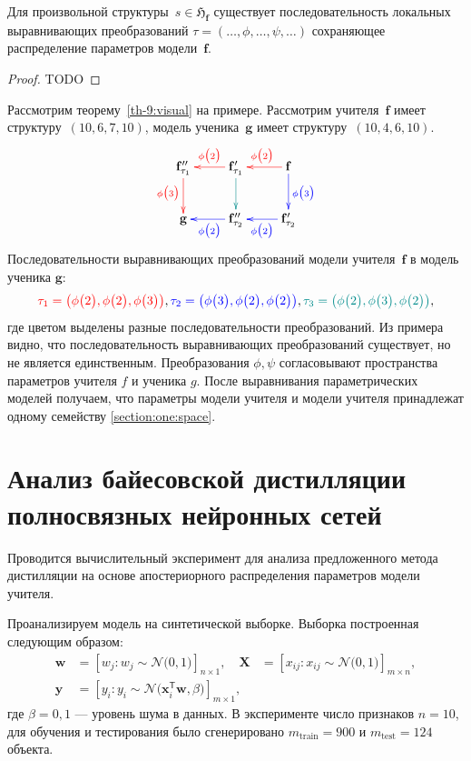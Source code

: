 \begin{theorem}
\label{th-9:visual}
Для произвольной структуры~$s \in \mathfrak{H}_{\mathbf{f}}$ существует последовательность локальных выравнивающих преобразований $\tau = (\ldots, \phi, \ldots, \psi, \ldots)$ сохраняющее распределение параметров модели~$\mathbf{f}$.
\end{theorem}
\begin{proof}
TODO
\end{proof}

Рассмотрим теорему~\ref{th-9:visual} на примере. Рассмотрим учителя~$\mathbf{f}$ имеет структуру~$(10, 6, 7, 10)$, модель ученика~$\mathbf{g}$ имеет структуру~$(10,4,6,10)$.
\[
\xymatrix{
\mathbf{f}_{\tau_1}''\ar@[red][d]_{\color{red}\phi\bigr(3\bigr)}
& 
\mathbf{f}_{\tau_1}'\ar@[red][l]_{\color{red}\phi\bigr(2\bigr)}\ar@[darkcyan][d]
&
\mathbf{f}\ar@[red][l]_{\color{red}\phi\bigr(2\bigr)}\ar@[blue][d]^{\color{blue}\phi\bigr(3\bigr)}
\\
\mathbf{g}
& 
\mathbf{f}_{\tau_2}''\ar@[blue][l]^{\color{blue}\phi\bigr(2\bigr)}
&
\mathbf{f}_{\tau_2}'\ar@[blue][l]^{\color{blue}\phi\bigr(2\bigr)}
}
\]
Последовательности выравнивающих преобразований модели учителя~$\mathbf{f}$ в модель ученика $\mathbf{g}$:
\[
{\color{red}\tau_1=\left(\phi\bigr(2\bigr), \phi\bigr(2\bigr), \phi\bigr(3\bigr)\right)}, {\color{blue}\tau_2=\left(\phi\bigr(3\bigr), \phi\bigr(2\bigr), \phi\bigr(2\bigr)\right)}, {\color{darkcyan}\tau_3=\left(\phi\bigr(2\bigr), \phi\bigr(3\bigr), \phi\bigr(2\bigr)\right)},
\]
где цветом выделены разные последовательности преобразований.
Из примера видно, что последовательность выравнивающих преобразований существует, но не является единственным. Преобразования $\phi, \psi$ согласовывают пространства параметров учителя $f$ и ученика $g$. После выравнивания параметрических моделей получаем, что параметры модели учителя и модели учителя принадлежат одному семейству \ref{section:one:space}.

\section{Анализ байесовской дистилляции полносвязных нейронных сетей}
Проводится вычислительный эксперимент для анализа предложенного метода дистилляции на основе апостериорного распределения параметров модели учителя.

Проанализируем модель на синтетической выборке. Выборка построенная следующим образом:
\[
\label{eq:ex:1}
\begin{aligned}
\mathbf{w} &= \left[w_j: w_{j}\sim \mathcal{N}\bigr(0, 1\bigr)\right]_{n\times 1}, \quad \mathbf{X} &= \left[x_{ij}: x_{ij}\sim\mathcal{N}\bigr(0, 1\bigr)\right]_{m\times n}, \\
 \mathbf{y} &= \left[y_i: y_i \sim \mathcal{N}\bigr(\mathbf{x}_i^{\mathsf{T}}\mathbf{w}, \beta\bigr)\right]_{m \times 1},
\end{aligned}
\] 
где $\beta=0{,}1$ --- уровень шума в данных. В эксперименте число признаков $n=10$, для обучения и тестирования было сгенерировано $m_{\text{train}}=900$ и $m_{\text{test}}=124$ объекта.

